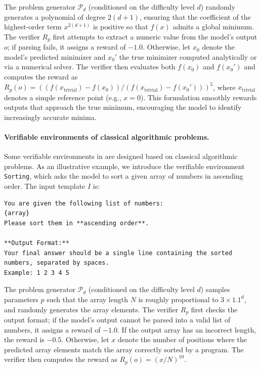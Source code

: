 \documentclass{article}
\theoremstyle{plain}
\theoremstyle{definition}
\theoremstyle{remark}
\begin{document}
The problem generator $\mathcal{P}_{d}$ (conditioned on the difficulty level $d$) randomly generates a polynomial of degree $2(d+1)$, ensuring that the coefficient of the highest-order term $x^{2(d+1)}$ is positive so that $f(x)$ admits a global minimum. 
The verifier $R_{p}$ first attempts to extract a numeric value from the model’s output $o$; if parsing fails, it assigns a reward of $-1.0$.
Otherwise, let $x_0$ denote the model’s predicted minimizer and $x_0'$ the true minimizer computed analytically or via a numerical solver.
The verifier then evaluates both $f(x_0)$ and $f(x_0')$ and computes the reward as $R_{p}(o) = ((f(x_{\mathrm{trivial}}) - f(x_0))/(f(x_{\mathrm{trivial}}) - f(x_0')))^5$,
where $x_{\mathrm{trivial}}$ denotes a simple reference point (e.g., $x=0$).
This formulation smoothly rewards outputs that approach the true minimum, encouraging the model to identify increasingly accurate minima.

\paragraph{Verifiable environments of classical algorithmic problems.}
Some verifiable environments in \suite{} are designed based on classical algorithmic problems. 
As an illustrative example, we introduce the verifiable environment \texttt{Sorting}, which asks the model to sort a given array of numbers in ascending order.
The input template $I$ is:
\begin{lstlisting}[language={},caption={},label={}]
You are given the following list of numbers:
{array}
Please sort them in **ascending order**.

**Output Format:**
Your final answer should be a single line containing the sorted numbers, separated by spaces.
Example: 1 2 3 4 5
\end{lstlisting}
The problem generator $\mathcal{P}_{d}$ (conditioned on the difficulty level $d$) samples parameters $p$ such that the array length $N$ is roughly proportional to $3\times1.1^d$, and randomly generates the array elements.
The verifier $R_{p}$ first checks the output format; if the model’s output cannot be parsed into a valid list of numbers, it assigns a reward of $-1.0$.
If the output array has an incorrect length, the reward is $-0.5$.
Otherwise, let $x$ denote the number of positions where the predicted array elements match the array correctly sorted by a program.
The verifier then computes the reward as $R_{p}(o) = (x / N)^{10}$.
\end{document}
